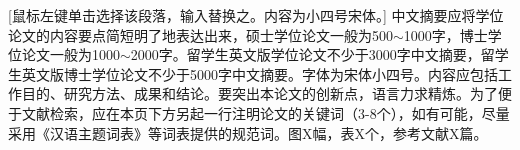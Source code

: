 [鼠标左键单击选择该段落，输入替换之。内容为小四号宋体。] 中文摘要应将学位论文的内容要点简短明了地表达出来，硕士学位论文一般为500$\sim$1000字，博士学位论文一般为1000$\sim$2000字。留学生英文版学位论文不少于3000字中文摘要，留学生英文版博士学位论文不少于5000字中文摘要。字体为宋体小四号。内容应包括工作目的、研究方法、成果和结论。要突出本论文的创新点，语言力求精炼。为了便于文献检索，应在本页下方另起一行注明论文的关键词（3-8个），如有可能，尽量采用《汉语主题词表》等词表提供的规范词。图X幅，表X个，参考文献X篇。